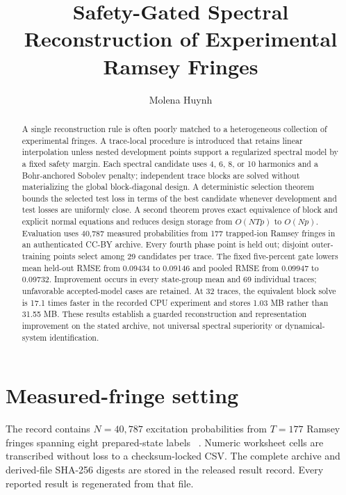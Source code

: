 \documentclass[10pt,letterpaper,twoside]{article}
\begin{document}
\title{Safety-Gated Spectral Reconstruction of Experimental Ramsey Fringes}
\author{Molena Huynh}
\maketitle

\begin{abstract}
A single reconstruction rule is often poorly matched to a heterogeneous
collection of experimental fringes. A trace-local procedure is introduced
that retains linear interpolation unless nested development points support a
regularized spectral model by a fixed safety margin. Each spectral candidate
uses 4, 6, 8, or 10 harmonics and a Bohr-anchored Sobolev penalty; independent
trace blocks are solved without materializing the global block-diagonal
design. A deterministic selection theorem bounds the selected test loss in
terms of the best candidate whenever development and test losses are uniformly
close. A second theorem proves exact equivalence of block and explicit normal
equations and reduces design storage from $O(NTp)$ to $O(Np)$. Evaluation uses
40,787 measured probabilities from 177 trapped-ion Ramsey fringes in an
authenticated CC-BY archive. Every fourth phase point is held out; disjoint
outer-training points select among 29 candidates per trace. The fixed
five-percent gate lowers mean held-out RMSE from 0.09434 to 0.09146 and pooled
RMSE from 0.09947 to 0.09732. Improvement occurs in every state-group mean and
69 individual traces; unfavorable accepted-model cases are retained. At 32
traces, the equivalent block solve is 17.1 times faster in the recorded CPU
experiment and stores 1.03 MB rather than 31.55 MB. These results establish a
guarded reconstruction and representation improvement on the stated archive,
not universal spectral superiority or dynamical-system identification.
\end{abstract}

\section{Measured-fringe setting}

The record contains $N=40{,}787$ excitation probabilities from $T=177$
Ramsey fringes spanning eight prepared-state labels
~\cite{kovalenko2025ramsey}. Numeric worksheet cells are transcribed without
loss to a checksum-locked CSV. The complete archive and derived-file SHA-256
digests are stored in the released result record. Every reported result is
regenerated from that file.
\end{document}
